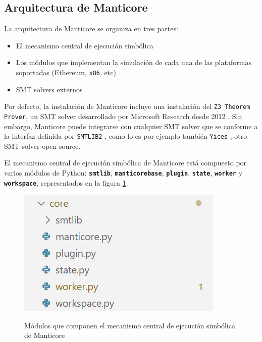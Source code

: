 \subsection{Arquitectura de Manticore}
La arquitectura de Manticore se organiza en tres partes:
\begin{itemize}
    \item El mecanismo central de ejecución simbólica
    \item Los módulos que implementan la simulación de cada una de las plataformas soportadas (Ethereum, \texttt{x86}, etc)
    \item SMT solvers externos
\end{itemize}

Por defecto, la instalación de Manticore incluye una instalación del \texttt{Z3 Theorem Prover}, un SMT solver desarrollado por Microsoft Research desde 2012 \cite{z3TheoremProver}.
Sin embargo, Manticore puede integrarse con cualquier SMT solver que se conforme a la interfaz definida por \texttt{SMTLIB2} \cite{smtlib2}, como lo es por ejemplo también \texttt{Yices} \cite{yices}, otro SMT solver open source.

El mecanismo central de ejecución simbólica de Manticore está compuesto por varios módulos de Python: \texttt{\textbf{smtlib}}, \texttt{\textbf{manticorebase}}, \texttt{\textbf{plugin}}, \texttt{\textbf{state}}, \texttt{\textbf{worker}} y \texttt{\textbf{workspace}}, representados en la figura \ref{fig:core-modules}.

\begin{figure}
    \centering
    {\includegraphics {figs/core-architecture-manticore.png}}
    \caption{Módulos que componen el mecanismo central de ejecución simbólica de Manticore}
    \label{fig:core-modules}
\end{figure}

